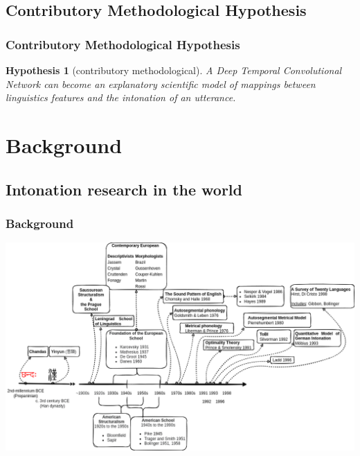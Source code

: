 \documentclass[a4paper,9pt]{beamer}
\theoremstyle{mytheoremstyle}
\newtheorem{hypothesis}{Hypothesis}
\begin{document}
\subsection{Contributory Methodological Hypothesis}
\begin{frame}
\frametitle{Contributory Methodological Hypothesis}
\begin{tcolorbox}
\begin{hypothesis}[contributory methodological]
\label{contributory}
A Deep Temporal Convolutional Network can become an explanatory scientific model of mappings between linguistics features and the intonation of an utterance.
\end{hypothesis}
\end{tcolorbox}
\end{frame}

\section{Background}



\subsection{Intonation research in the world}
\begin{frame}
\frametitle{Background}
\includegraphics[width=\textwidth]{res/background.png}
\end{frame}
\end{document}
